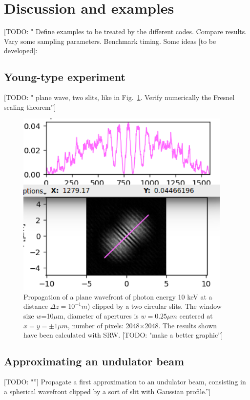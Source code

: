 \documentclass{iucr}              %
\newcommand{\todo}[1]{{\color{red}[TODO: "#1'']}}
\begin{document}
\section{Discussion and examples}

\todo{
Define examples to be treated by the different codes. Compare results. Vary some sampling parameters. Benchmark timing. Some ideas [to be developed]: 


\subsection{Young-type experiment}
\todo{ plane wave, two slits, like in Fig.~\ref{fig: srw two slits}. Verify numerically the Fresnel scaling theorem}

\begin{figure}
\label{fig: srw two slits}
\caption{Propagation of a plane wavefront of photon energy 10 keV at a distance $\Delta z = 10^{-1}m$) clipped by a two circular slits. The window size $w$=10$\mu$m, diameter of apertures is $w=0.25\mu m$ centered at $x=y=\pm 1 \mu m$, number of pixels: 2048$\times$2048. The results shown have been calculated with SRW. \todo{make a better graphic}
}
\includegraphics[width=0.95\textwidth]{srw_two_slits.png}
\end{figure}

\subsection{Approximating an undulator beam}
\todo{}
Propagate a first approximation to an undulator beam, consisting in a spherical wavefront clipped by a sort of slit with Gaussian profile.}
\end{document}
